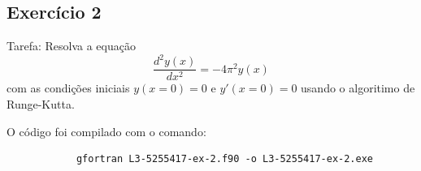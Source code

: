 \documentclass[12pt, a4paper]{article} %
\begin{document}
    \subsection{Exerc\'icio 2}

        Tarefa: Resolva a equa\c{c}\~ao
        \begin{equation*}
            \frac{d^{2}y(x)}{dx^{2}} = -4\pi^{2}y(x)
        \end{equation*}
        com as condi\c{c}\~oes iniciais $y(x=0) = 0$ e $y'(x=0) = 0$ usando o algoritimo de Runge-Kutta.


        O c\'odigo foi compilado com o comando:
        \begin{verbatim}
            gfortran L3-5255417-ex-2.f90 -o L3-5255417-ex-2.exe
        \end{verbatim}
\end{document}
